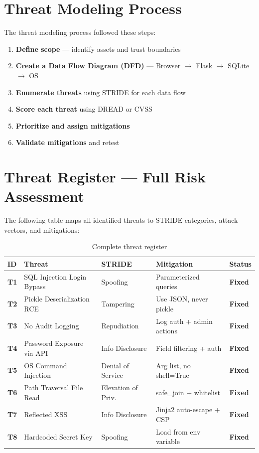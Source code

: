 \documentclass[12pt,a4paper]{report}
\begin{document}
\section{Threat Modeling Process}

The threat modeling process followed these steps:

\begin{enumerate}[leftmargin=1.5cm]
  \item \textbf{Define scope} — identify assets and trust boundaries
  \item \textbf{Create a Data Flow Diagram (DFD)} — Browser $\rightarrow$ Flask $\rightarrow$ SQLite $\rightarrow$ OS
  \item \textbf{Enumerate threats} using STRIDE for each data flow
  \item \textbf{Score each threat} using DREAD or CVSS
  \item \textbf{Prioritize and assign mitigations}
  \item \textbf{Validate mitigations} and retest
\end{enumerate}

\section{Threat Register — Full Risk Assessment}

The following table maps all identified threats to STRIDE categories, attack vectors, and mitigations:

\begin{table}[H]
\centering
\begin{tabularx}{\textwidth}{>{\bfseries}l X l X l}
\toprule
ID & Threat & STRIDE & Mitigation & Status \\
\midrule
T1 & SQL Injection Login Bypass & Spoofing & Parameterized queries & \textcolor{codegreen}{\textbf{Fixed}} \\
T2 & Pickle Deserialization RCE & Tampering & Use JSON, never pickle & \textcolor{codegreen}{\textbf{Fixed}} \\
T3 & No Audit Logging & Repudiation & Log auth + admin actions & \textcolor{codegreen}{\textbf{Fixed}} \\
T4 & Password Exposure via API & Info Disclosure & Field filtering + auth & \textcolor{codegreen}{\textbf{Fixed}} \\
T5 & OS Command Injection & Denial of Service & Arg list, no shell=True & \textcolor{codegreen}{\textbf{Fixed}} \\
T6 & Path Traversal File Read & Elevation of Priv. & safe\_join + whitelist & \textcolor{codegreen}{\textbf{Fixed}} \\
T7 & Reflected XSS & Info Disclosure & Jinja2 auto-escape + CSP & \textcolor{codegreen}{\textbf{Fixed}} \\
T8 & Hardcoded Secret Key & Spoofing & Load from env variable & \textcolor{codegreen}{\textbf{Fixed}} \\
\bottomrule
\end{tabularx}
\caption{Complete threat register}
\end{table}
\end{document}
